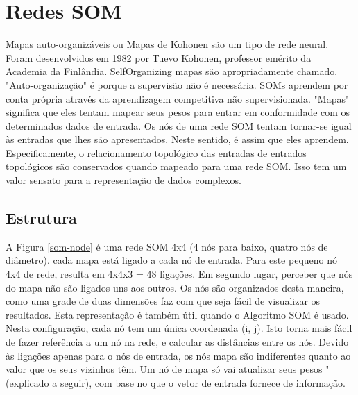 \section{Redes SOM}\label{som}
Mapas auto-organizáveis ou Mapas de Kohonen são um tipo de rede neural. Foram desenvolvidos em 1982 por Tuevo
Kohonen, professor emérito da Academia da Finlândia. SelfOrganizing mapas são apropriadamente chamado. "Auto-organização" é porque a supervisão não é
necessária. SOMs aprendem por conta própria através da aprendizagem competitiva não supervisionada.
"Mapas" significa que eles tentam mapear seus pesos para entrar em conformidade com os determinados
dados de entrada. Os nós de uma rede SOM tentam tornar-se igual às entradas 
que lhes são apresentados. Neste sentido, é assim que eles aprendem. Especificamente, o relacionamento topológico das entradas de entrados topológicos
são conservados quando mapeado para uma rede SOM. Isso tem um valor sensato
para a representação de dados complexos.

\subsection{Estrutura}

A Figura \ref{som-node} é uma rede SOM 4x4 (4 nós para baixo, quatro nós de diâmetro). 
cada mapa está ligado a cada nó de entrada. Para este pequeno nó 4x4
de rede, resulta em 4x4x3 = 48 ligações. Em segundo lugar, perceber que nós do mapa não são
ligados uns aos outros. Os nós são organizados desta maneira, como uma grade de duas dimensões
faz com que seja fácil de visualizar os resultados. Esta representação é também útil quando o
Algoritmo SOM é usado. Nesta configuração, cada nó tem um única coordenada (i, j).
Isto torna mais fácil de fazer referência a um nó na rede, e
calcular as distâncias entre os nós. Devido às ligações apenas para o
nós de entrada, os nós mapa são indiferentes quanto ao valor que os seus vizinhos têm.
Um nó de mapa só vai atualizar seus pesos "(explicado a seguir), com base no que o vetor de entrada
fornece de informação.

